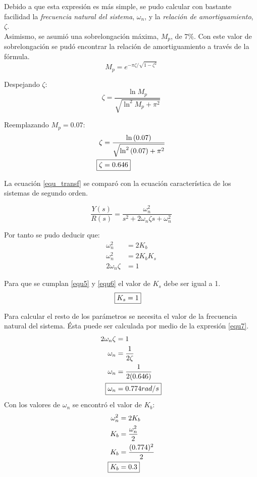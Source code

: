 \documentclass[journal]{IEEEtran}
\begin{document}
Debido a que esta expresi\'on es m\'as simple, se pudo 
calcular con bastante facilidad la \textit{frecuencia 
natural del sistema}, $\omega_n$, y la \textit{relaci\'on 
de amortiguamiento}, $\zeta$. \\

Asimismo, se asumi\'o una sobrelongaci\'on m\'axima, 
$M_p$, de
7\%. Con este valor de sobrelongaci\'on se pud\'o encontrar 
la relaci\'on de amortiguamiento a trav\'es de la f\'ormula.
\begin{displaymath}
	M_p = e^{-\pi \zeta / \sqrt{1 - \zeta^2}}  
\end{displaymath}

Despejando $\zeta$:
\begin{displaymath}
	\zeta = \frac{\ln{M_p}}{\sqrt{\ln^2{M_p} + \pi^2}}
\end{displaymath}

Reemplazando $M_p = 0.07$: 
\begin{align*}
	\zeta & = \frac{\ln{(0.07)}}
	{\sqrt{\ln^2{(0.07)} + \pi^2}} \\
	\Aboxed { \zeta & = 0.646}
\end{align*}

La ecuaci\'on \ref{equ_transf} se compar\'o con la ecuaci\'on 
caracter\'istica de los sistemas de segundo orden. 

\begin{equation}
\frac{Y(s)}{R(s)} = \frac{\omega^2_n}
{s^2 + 2 \omega_n \zeta s + \omega^2_n}
\end{equation}

Por tanto se pudo deducir que:  
\begin{align}
	\label{equ5} \omega^2_n & = 2 K_b \\
	\label{equ6} \omega^2_n & = 2 K_b K_s \\
	\label{equ7} 2 \omega_n \zeta & = 1 
\end{align}

Para que se cumplan \ref{equ5} y \ref{equ6} el valor de $K_s$ 
debe ser igual a 1. 
\begin{align*}
	\Aboxed{ K_s = 1} 	
\end{align*}

Para calcular el resto de los par\'ametros se necesita el 
valor de la frecuencia natural del sistema. \'Esta puede ser
calculada por medio de la expresi\'on \ref{equ7}. 
\begin{align*}
	2 \omega_n \zeta & = 1 \\
	\omega_n & = \frac{1}{2 \zeta} \\
	\omega_n & = \frac{1}{2 (0.646)} \\
	\Aboxed{ \omega_n & = 0.774 rad/s}
\end{align*}
Con los valores de $\omega_n $ se encontr\'o el valor de 
$K_b$: 
\begin{align*}
	\omega^2_n & = 2 K_b \\ 
	K_b & = \frac{\omega^2_n}{2} \\
	K_b & = \frac{(0.774)^2}{2} \\
	\Aboxed{ K_b & = 0.3}
\end{align*}
\end{document}
